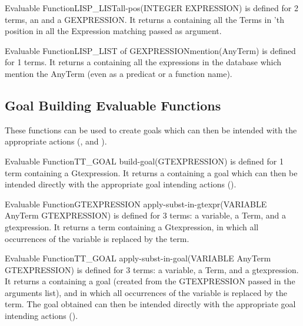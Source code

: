 \begin{typeefa}{Evaluable Function}{LISP\_LIST}{all-pos}{(INTEGER EXPRESSION)}
is defined for 2 terms, an  and a
GEXPRESSION.  It returns a  containing all the Terms in
'th position in all the Expression matching 
passed as argument.
\end{typeefa}

\begin{typeefa}{Evaluable Function}{LISP\_LIST of GEXPRESSION}{mention}{(AnyTerm)}
is defined for 1 terms.  It returns a  containing all the
expressions in the database which mention the AnyTerm (even as a predicat or a
function name).
\end{typeefa}

\subsection{Goal Building Evaluable Functions}

These functions can be used to create goals which can then be intended with the
appropriate actions (, and  ). 

\begin{typeefa}{Evaluable Function}{TT\_GOAL} {build-goal}{(GTEXPRESSION)}
is defined for 1 term containing a Gtexpression. It returns a
 containing a goal which can then be intended directly with the
appropriate goal intending actions ().
\end{typeefa}

\begin{typeefa}{Evaluable Function}{GTEXPRESSION} {apply-subst-in-gtexpr}{(VARIABLE
AnyTerm GTEXPRESSION)}
is defined for 3 terms: a variable, a Term, and a
gtexpression. It returns a term containing a Gtexpression,
in which all occurrences of the variable is replaced by the term. 
\end{typeefa}

\begin{typeefa}{Evaluable Function}{TT\_GOAL} {apply-subst-in-goal}{(VARIABLE AnyTerm GTEXPRESSION)}
is defined for 3 terms: a variable, a Term, and a gtexpression. It returns a
 containing a goal (created from the GTEXPRESSION passed in the
arguments list), and in which all occurrences of the variable is replaced by
the term.  The goal obtained can then be intended directly with the appropriate
goal intending actions ().
\end{typeefa}

